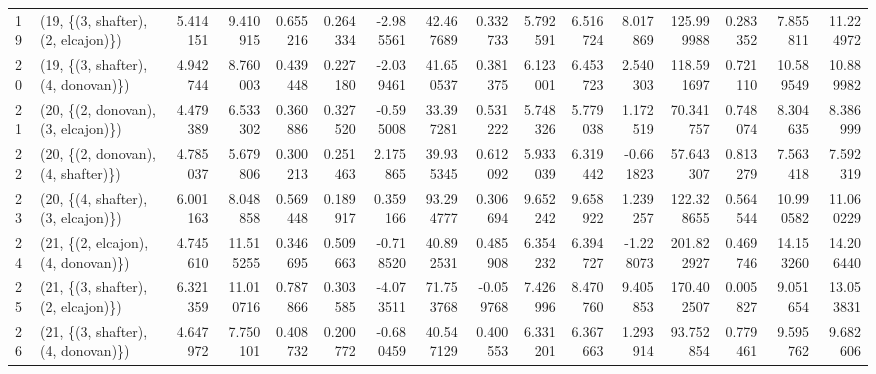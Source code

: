 \begin{tabular}{llrrrrrrrrrrrrrr}
19 &  (19, \{(3, shafter), (2, elcajon)\}) &  5.414151 &   9.410915 &   0.655216 &  0.264334 & -2.985561 &   42.467689 &  0.332733 &   5.792591 &   6.516724 &  8.017869 &  125.999988 &  0.283352 &   7.855811 &  11.224972 \\
20 &  (19, \{(3, shafter), (4, donovan)\}) &  4.942744 &   8.760003 &   0.439448 &  0.227180 & -2.039461 &   41.650537 &  0.381375 &   6.123001 &   6.453723 &  2.540303 &  118.591697 &  0.721110 &  10.589549 &  10.889982 \\
21 &  (20, \{(2, donovan), (3, elcajon)\}) &  4.479389 &   6.533302 &   0.360886 &  0.327520 & -0.595008 &   33.397281 &  0.531222 &   5.748326 &   5.779038 &  1.172519 &   70.341757 &  0.748074 &   8.304635 &   8.386999 \\
22 &  (20, \{(2, donovan), (4, shafter)\}) &  4.785037 &   5.679806 &   0.300213 &  0.251463 &  2.175865 &   39.935345 &  0.612092 &   5.933039 &   6.319442 & -0.661823 &   57.643307 &  0.813279 &   7.563418 &   7.592319 \\
23 &  (20, \{(4, shafter), (3, elcajon)\}) &  6.001163 &   8.048858 &   0.569448 &  0.189917 &  0.359166 &   93.294777 &  0.306694 &   9.652242 &   9.658922 &  1.239257 &  122.328655 &  0.564544 &  10.990582 &  11.060229 \\
24 &  (21, \{(2, elcajon), (4, donovan)\}) &  4.745610 &  11.515255 &   0.346695 &  0.509663 & -0.718520 &   40.892531 &  0.485908 &   6.354232 &   6.394727 & -1.228073 &  201.822927 &  0.469746 &  14.153260 &  14.206440 \\
25 &  (21, \{(3, shafter), (2, elcajon)\}) &  6.321359 &  11.010716 &   0.787866 &  0.303585 & -4.073511 &   71.753768 & -0.059768 &   7.426996 &   8.470760 &  9.405853 &  170.402507 &  0.005827 &   9.051654 &  13.053831 \\
26 &  (21, \{(3, shafter), (4, donovan)\}) &  4.647972 &   7.750101 &   0.408732 &  0.200772 & -0.680459 &   40.547129 &  0.400553 &   6.331201 &   6.367663 &  1.293914 &   93.752854 &  0.779461 &   9.595762 &   9.682606 \\
\bottomrule
\end{tabular}
